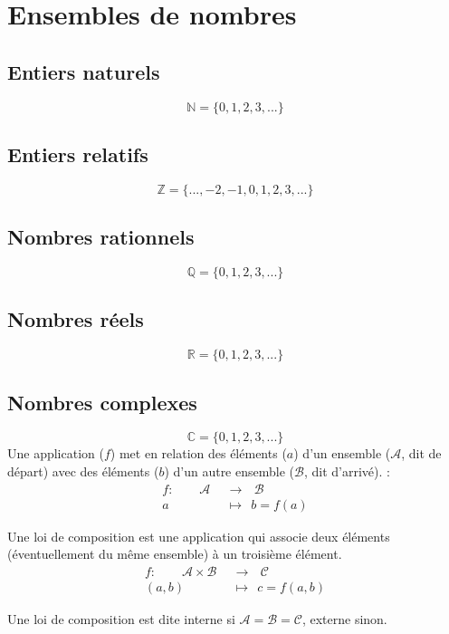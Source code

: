 
\section{Ensembles de nombres}

\subsection{Entiers naturels}
\[
\mathbb{N} = \{ 0, 1, 2, 3, ... \}
\]
\subsection{Entiers relatifs}
\[
\mathbb{Z} = \{ ..., -2, -1, 0, 1, 2, 3, ... \}
\]
\subsection{Nombres rationnels}
\[
\mathbb{Q} = \{ 0, 1, 2, 3, ... \}
\]
\subsection{Nombres réels}
\[
\mathbb{R} = \{ 0, 1, 2, 3, ... \}
\]
\subsection{Nombres complexes}
\[
\mathbb{C} = \{ 0, 1, 2, 3, ... \}
\]
Une application ($f$) met en relation des éléments ($a$) d'un ensemble ($\mathcal{A}$, dit de départ) avec des éléments ($b$) d'un autre ensemble ($\mathcal{B}$, dit d'arrivé). :
\begin{align*}
f :\ \ \ \ \ \ \ \ \ \mathcal{A} \ \  & \rightarrow \ \ \ \mathcal{B} \\
a \ \ & \mapsto \ \ b = f(a)
\end{align*}

Une loi de composition est une application qui associe deux éléments (éventuellement du même ensemble) à un troisième élément. 
\begin{align*}
f :\ \ \ \ \ \ \ \ \ \mathcal{A} \times \mathcal{B} \ \  & \rightarrow \ \ \ \mathcal{C} \\
(a,b) \ \ & \mapsto \ \ c = f(a,b)
\end{align*}

Une loi de composition est dite interne si $\mathcal{A} = \mathcal{B} = \mathcal{C}$, externe sinon.

